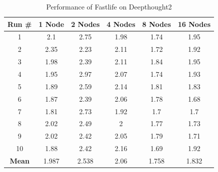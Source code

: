 \documentclass[11pt,letterpaper]{article}
\begin{document}
\begin{table}[t!]
    \renewcommand{\arraystretch}{1.5}
    \centering
\begin{tabular}{ | c || c | c | c | c | c | }
	\hline
	\textbf{Run #} & \textbf{1 Node} & \textbf{2 Nodes} & \textbf{4 Nodes} &	 \textbf{8 Nodes} & \textbf{16 Nodes} \\
	\hline
	1 & 2.1 & 2.75 & 1.98 & 1.74 & 1.95 \\
	2 & 2.35 & 2.23 & 2.11 & 1.72 & 1.92 \\
	3 & 1.98 & 2.39 & 2.11 & 1.84 & 1.95 \\
	4 & 1.95 & 2.97 & 2.07 & 1.74 & 1.93 \\
	5 & 1.89 & 2.59 & 2.14 & 1.81 & 1.83 \\
	6 & 1.87 & 2.39 & 2.06 & 1.78 & 1.68 \\
	7 & 1.81 & 2.73 & 1.92 & 1.7 & 1.7 \\
	8 & 2.02 & 2.49 & 2 & 1.77 & 1.73 \\
	9 & 2.02 & 2.42 & 2.05 & 1.79 & 1.71 \\
	10 & 1.88 & 2.42 & 2.16 & 1.69 & 1.92 \\
	\hline
	\textbf{Mean} & 1.987 & 2.538 & 2.06 & 1.758 & 1.832 \\
	\hline
\end{tabular}
	\caption{Performance of Fastlife on Deepthought2}
	\label{table:deepthought2-performance}
\end{table}
\end{document}
